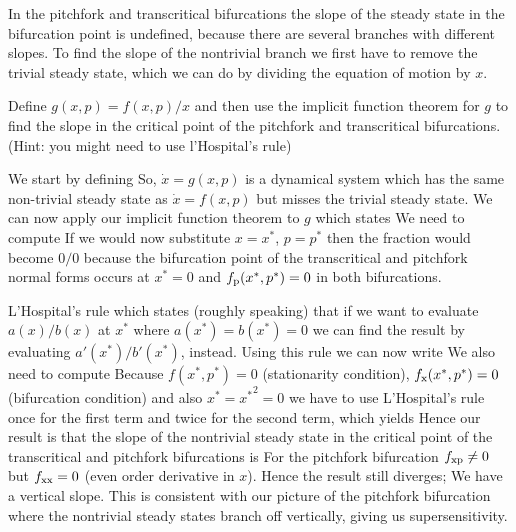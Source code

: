 In the pitchfork and transcritical bifurcations the slope of the steady state in the bifurcation point is undefined, because there are several branches with different slopes. To find the slope of the nontrivial branch we first have to remove the trivial steady state, which we can do by dividing the equation of motion by $x$. 

\subquestion Define $g(x,p)=f(x,p)/x$ and then use the implicit function theorem for $g$ to find the slope in the critical point of the pitchfork and transcritical bifurcations. (Hint: you might need to use l'Hospital's rule)

\solution 
We start by defining 
So, $\dot{x}=g(x,p)$ is a dynamical system which has the same non-trivial steady state as $\dot{x}=f(x,p)$ but misses the trivial steady state. We can now apply our implicit function theorem to $g$ which states 
We need to compute 
If we would now substitute $x=x^*$, $p=p^*$ then the fraction would become $0/0$ because the bifurcation point of the transcritical and pitchfork normal forms occurs at $x^*=0$ and $f_{\rm p}(x^*,p^*)=0$ in both bifurcations. 

L'Hospital's rule which states (roughly speaking) that if we want to evaluate $a(x)/b(x)$ at $x^*$ where $a(x^*)=b(x^*)=0$ we can find the result by evaluating 
$a'(x^*)/b'(x^*)$, instead. Using this rule we can now write
We also need to compute 
Because $f(x^*,p^*)=0$ (stationarity condition), $f_{\rm x}(x^*,p^*)=0$ (bifurcation condition) and also $x^*={x^*}^2=0$ we have to use L'Hospital's rule once for the first term and twice for the second term, which yields
Hence our result is that the slope of the nontrivial steady state in the critical point of the transcritical and pitchfork bifurcations is
For the pitchfork bifurcation $f_{\rm xp}\neq 0$ but $f_{\rm xx}=0$ (even order derivative in $x$). Hence the result still diverges; We have a vertical slope. This is consistent with our picture of the pitchfork bifurcation where the nontrivial steady states branch off vertically, giving us supersensitivity. 

